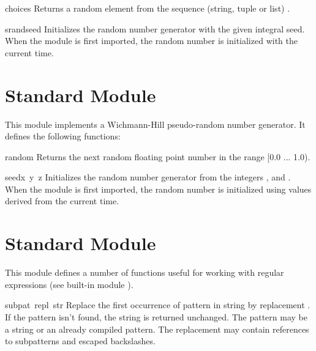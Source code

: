 \begin{funcdesc}{choice}{s}
Returns a random element from the sequence (string, tuple or list)
.
\end{funcdesc}

\begin{funcdesc}{srand}{seed}
Initializes the random number generator with the given integral seed.
When the module is first imported, the random number is initialized with
the current time.
\end{funcdesc}

\section{Standard Module }

This module implements a Wichmann-Hill pseudo-random number generator.
It defines the following functions:

\renewcommand{\indexsubitem}{(in module whrandom)}
\begin{funcdesc}{random}{}
Returns the next random floating point number in the range [0.0 ... 1.0).
\end{funcdesc}

\begin{funcdesc}{seed}{x\, y\, z}
Initializes the random number generator from the integers
,
and
.
When the module is first imported, the random number is initialized
using values derived from the current time.
\end{funcdesc}

\section{Standard Module }

This module defines a number of functions useful for working with
regular expressions (see built-in module ).

\renewcommand{\indexsubitem}{(in module regsub)}
\begin{funcdesc}{sub}{pat\, repl\, str}
Replace the first occurrence of pattern  in string
 by replacement .  If the pattern isn't found,
the string is returned unchanged.  The pattern may be a string or an
already compiled pattern.  The replacement may contain references
 to subpatterns and escaped backslashes.
\end{funcdesc}

